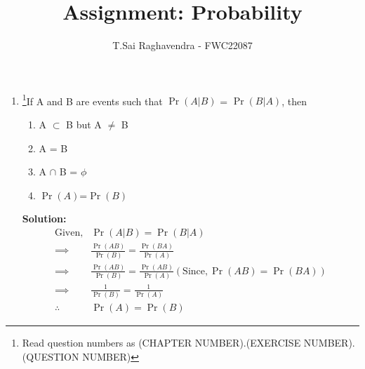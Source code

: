 \documentclass{article}
\providecommand{\pr}[1]{\ensuremath{\Pr\left(#1\right)}}
\newcommand{\solution}{\noindent \textbf{Solution: }}
\begin{document}
\title{Assignment: Probability}
\author{\Large T.Sai Raghavendra - FWC22087}
\date{}


\maketitle
\begin{enumerate}[label=13.\arabic{enumi}.\arabic{enumii}]%
\setcounter{enumi}{0}
\setcounter{enumii}{17}


\item \footnote{Read question numbers as (CHAPTER NUMBER).(EXERCISE NUMBER).(QUESTION NUMBER)}If A and B are events such that \pr{A|B} = \pr{B|A}, then\\
\begin{enumerate}
\item A $\subset$ B but A $\not=$ B
\item A = B
\item A $\cap$ B = $\phi$
\item \pr{A}=\pr{B}
\end{enumerate}

\solution \begin{align}
\text{Given}, & \pr{A|B} = \pr{B|A}\\
\implies&  \frac{\pr{AB}}{\pr{B}} = \frac{\pr{BA}}{\pr{A}}\\ 
\implies&  \frac{\pr{AB}}{\pr{B}} = \frac{\pr{AB}}{\pr{A}} (\text{Since}, \pr{AB} = \pr{BA})\\
\implies&  \frac{1}{\pr{B}} = \frac{1}{\pr{A}}\\
\therefore&  \pr{A}=\pr{B}
\end{align}
\end{enumerate}
\end{document}
